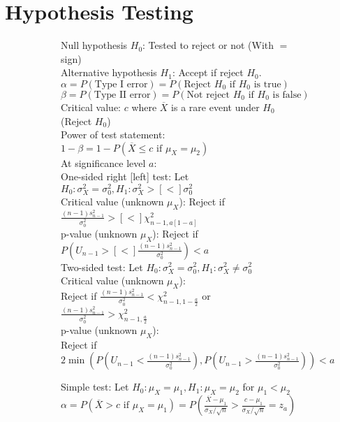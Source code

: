 \documentclass{article}
\begin{document}
\section{Hypothesis Testing}
\begin{figure}[h!]
    \begin{subfigure}[h!]{0.5\textwidth}
        Null hypothesis $H_{0}$: Tested to reject or not (With $=$ sign)\\
        Alternative hypothesis $H_{1}$: Accept if reject $H_{0}$.\\
        $\alpha=P(\text{Type I error})=P(\text{Reject }H_{0}\text{ if }H_{0}\text{ is true})$\\
        $\beta=P(\text{Type II error})=P(\text{Not reject }H_{0}\text{ if }H_{0}\text{ is false})$\\
        Critical value: $c$ where $\overline{X}$ is a rare event under $H_{0}$ (Reject $H_{0}$)\\
        Power of test statement: $1-\beta=1-P(\overline{X}\leq c\text{ if }\mu_{X}=\mu_{2})$\\
        At significance level $a$:\\
        One-sided right [left] test: Let $H_{0}:\sigma_{X}^{2}=\sigma_{0}^{2},H_{1}:\sigma_{X}^{2}>[<]\sigma_{0}^{2}$\\
        Critical value (unknown $\mu_{X}$): Reject if $\frac{(n-1)s_{n-1}^{2}}{\sigma_{0}^{2}}>[<]\chi_{n-1,a[1-a]}^{2}$\\
        p-value (unknown $\mu_{X}$): Reject if $P(U_{n-1}>[<]\frac{(n-1)s_{n-1}^{2}}{\sigma_{0}^{2}})<a$\\
        Two-sided test: Let $H_{0}:\sigma_{X}^{2}=\sigma_{0}^{2},H_{1}:\sigma_{X}^{2}\neq\sigma_{0}^{2}$\\
        Critical value (unknown $\mu_{X}$):\\
        Reject if $\frac{(n-1)s_{n-1}^{2}}{\sigma_{0}^{2}}<\chi_{n-1,1-\frac{a}{2}}^{2}$ or $\frac{(n-1)s_{n-1}^{2}}{\sigma_{0}^{2}}>\chi_{n-1,\frac{a}{2}}^{2}$\\
        p-value (unknown $\mu_{X}$):\\
        Reject if $2\min(P(U_{n-1}<\frac{(n-1)s_{n-1}^{2}}{\sigma_{0}^{2}}),P(U_{n-1}>\frac{(n-1)s_{n-1}^{2}}{\sigma_{0}^{2}}))<a$
    \end{subfigure}
    \begin{subfigure}[h!]{0.49\textwidth}
        Simple test: Let $H_{0}:\mu_{X}=\mu_{1}, H_{1}:\mu_{X}=\mu_{2}$ for $\mu_{1}<\mu_{2}$\\
        $\alpha=P(\overline{X}>c\text{ if }\mu_{X}=\mu_{1})=P(\frac{\overline{X}-\mu_{1}}{\sigma_{X}/\sqrt{n}}>\frac{c-\mu_{1}}{\sigma_{X}/\sqrt{n}}=z_{a})$\\

\end{subfigure}
\end{figure}
\end{document}
